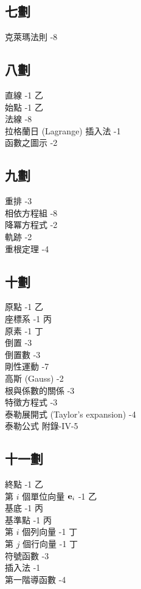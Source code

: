 \begin{multicols}{2}
\subsection*{七\quad 劃}
\noindent
克萊瑪法則 -8

\subsection*{八\quad 劃}
\noindent
直線 -1 乙\\
始點 -1 乙\\
法線 -8\\
拉格蘭日 (Lagrange) 插入法 -1\\
函數之圖示 -2

\subsection*{九\quad 劃}
\noindent
重排 -3\\
相依方程組 -8\\
降冪方程式 -2\\
軌跡 -2\\
重根定理 -4

\subsection*{十\quad 劃}
\noindent
原點 -1 乙\\
座標系 -1 丙\\
原素 -1 丁\\
倒置 -3\\
倒置數 -3\\
剛性運動 -7\\
高斯 (Gauss) -2\\
根與係數的關係 -3\\
特徵方程式 -3\\
泰勒展開式 (Taylor's expansion) -4\\
泰勒公式 \dotfill 附錄-IV-5

\subsection*{十一\quad 劃}
\noindent
終點 -1 乙\\
第 $i$ 個單位向量 $\boldsymbol{\mathbf{e}}_i$ -1 乙\\
基底 -1 丙\\
基準點 -1 丙\\
第 $i$ 個列向量 -1 丁\\
第 $j$ 個行向量 -1 丁\\
符號函數 -3\\
插入法 -1\\
第一階導函數 -4


\end{multicols}
